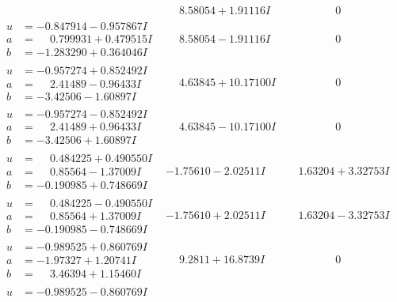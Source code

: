 \documentclass[1p]{elsarticle_modified}
\theoremstyle{definition}
\begin{document}
$$\begin{array}{c|c|c}
 & \phantom{-}8.58054 + 1.91116 I & \phantom{-0.000000 } 0 \\ \hline\begin{aligned}
u &= -0.847914 - 0.957867 I \\
a &= \phantom{-}0.799931 + 0.479515 I \\
b &= -1.283290 + 0.364046 I\end{aligned}
 & \phantom{-}8.58054 - 1.91116 I & \phantom{-0.000000 } 0 \\ \hline\begin{aligned}
u &= -0.957274 + 0.852492 I \\
a &= \phantom{-}2.41489 - 0.96433 I \\
b &= -3.42506 - 1.60897 I\end{aligned}
 & \phantom{-}4.63845 + 10.17100 I & \phantom{-0.000000 } 0 \\ \hline\begin{aligned}
u &= -0.957274 - 0.852492 I \\
a &= \phantom{-}2.41489 + 0.96433 I \\
b &= -3.42506 + 1.60897 I\end{aligned}
 & \phantom{-}4.63845 - 10.17100 I & \phantom{-0.000000 } 0 \\ \hline\begin{aligned}
u &= \phantom{-}0.484225 + 0.490550 I \\
a &= \phantom{-}0.85564 - 1.37009 I \\
b &= -0.190985 + 0.748669 I\end{aligned}
 & -1.75610 - 2.02511 I & \phantom{-}1.63204 + 3.32753 I \\ \hline\begin{aligned}
u &= \phantom{-}0.484225 - 0.490550 I \\
a &= \phantom{-}0.85564 + 1.37009 I \\
b &= -0.190985 - 0.748669 I\end{aligned}
 & -1.75610 + 2.02511 I & \phantom{-}1.63204 - 3.32753 I \\ \hline\begin{aligned}
u &= -0.989525 + 0.860769 I \\
a &= -1.97327 + 1.20741 I \\
b &= \phantom{-}3.46394 + 1.15460 I\end{aligned}
 & \phantom{-}9.2811 + 16.8739 I & \phantom{-0.000000 } 0 \\ \hline\begin{aligned}
u &= -0.989525 - 0.860769 I \\

\end{aligned}
\end{array}$$
\end{document}
